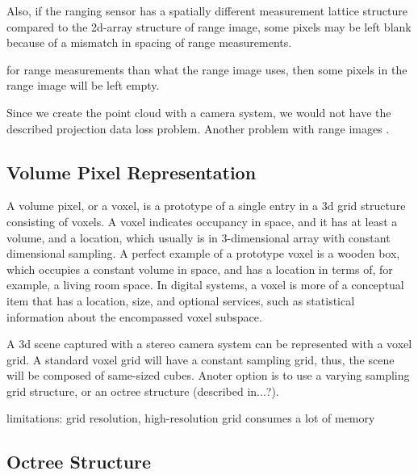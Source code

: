 \documentclass[12pt,a4paper,oneside,pdftex]{report}
\begin{document}
Also, if the ranging sensor has a spatially different measurement lattice structure compared to the 2d-array structure of range image, some pixels may be left blank because of a mismatch in spacing of range measurements.

for range measurements than what the range image uses, then some pixels in the range image will be left empty.

Since we create the point cloud with a camera system, we would not have the described projection data loss problem. Another problem with range images       \cite{Unnikrishnan08}.

\subsection{Volume Pixel Representation}
\label{subsection:volume_pixel_representation}

A volume pixel, or a voxel, is a prototype of a single entry in a 3d grid structure consisting of voxels. A voxel indicates occupancy in space, and it has at least a volume, and a location, which usually is in 3-dimensional array with constant dimensional sampling. A perfect example of a prototype voxel is a wooden box, which occupies a constant volume in space, and has a location in terms of, for example, a living room space. In digital systems, a voxel is more of a conceptual item that has a location, size, and optional services, such as statistical information about the encompassed voxel subspace. 

A 3d scene captured with a stereo camera system can be represented with a voxel grid. A standard voxel grid will have a constant sampling grid, thus, the scene will be composed of same-sized cubes. Anoter option is to use a varying sampling grid structure, or an octree structure (described in...?).

limitations: grid resolution, high-resolution grid consumes a lot of memory

\subsection{Octree Structure}
\label{subsection:octree_structure}
\end{document}
